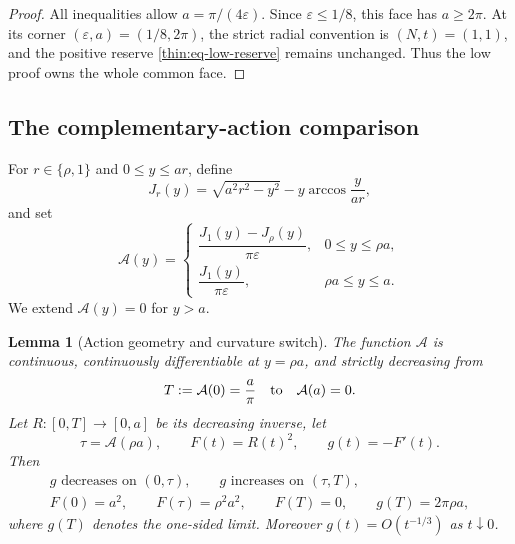 \documentclass[11pt]{article}
\numberwithin{equation}{section}
\newtheorem{lemma}[theorem]{Lemma}
\theoremstyle{definition}
\theoremstyle{remark}
\begin{document}
\begin{proof}
All inequalities allow \(a=\pi/(4\varepsilon)\).  Since
\(\varepsilon\leq1/8\), this face has \(a\geq2\pi\).  At its corner
\((\varepsilon,a)=(1/8,2\pi)\), the strict radial convention is
\((N,t)=(1,1)\), and the positive reserve
\eqref{thin:eq-low-reserve} remains unchanged.  Thus the low proof owns the
whole common face.
\end{proof}

\subsection{The complementary-action comparison}

For \(r\in\{\rho,1\}\) and \(0\leq y\leq ar\), define
\begin{equation}
  J_r(y)=\sqrt{a^2r^2-y^2}
          -y\arccos\frac{y}{ar},
  \label{thin:eq-J-action}
\end{equation}
and set
\begin{equation}
  \mathcal A(y)=
  \begin{cases}
  \dfrac{J_1(y)-J_\rho(y)}{\pi\varepsilon},
    &0\leq y\leq\rho a,\\[6pt]
  \dfrac{J_1(y)}{\pi\varepsilon},
    &\rho a\leq y\leq a.
  \end{cases}
  \label{thin:eq-action-definition}
\end{equation}
We extend \(\mathcal A(y)=0\) for \(y>a\).

\begin{lemma}[Action geometry and curvature switch]
\label{thin:lem-action-geometry}
The function \(\mathcal A\) is continuous, continuously differentiable at
\(y=\rho a\), and strictly decreasing from
\[
  T:=\mathcal A(0)=\frac a\pi
  \quad\hbox{to}\quad \mathcal A(a)=0.
\]
Let \(R:[0,T]\to[0,a]\) be its decreasing inverse, let
\[
  \tau=\mathcal A(\rho a),
  \qquad F(t)=R(t)^2,
  \qquad g(t)=-F'(t).
\]
Then
\begin{equation}
\begin{gathered}
  g\text{ decreases on }(0,\tau),
  \qquad g\text{ increases on }(\tau,T),\\
  F(0)=a^2,
  \qquad F(\tau)=\rho^2a^2,
  \qquad F(T)=0,
  \qquad g(T)=2\pi\rho a,
\end{gathered}
  \label{thin:eq-action-geometry}
\end{equation}
where \(g(T)\) denotes the one-sided limit.  Moreover \(g(t)=O(t^{-1/3})\)
as \(t\downarrow0\).
\end{lemma}
\end{document}
